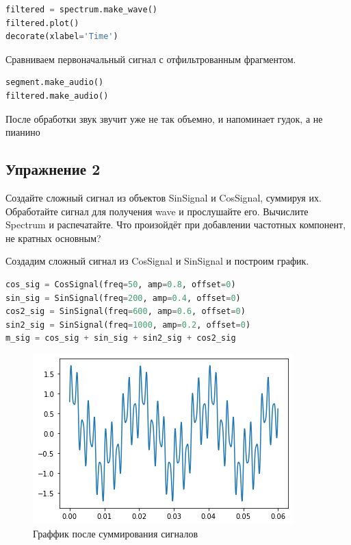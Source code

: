 \begin{lstlisting}[language=Python]
filtered = spectrum.make_wave()
filtered.plot()
decorate(xlabel='Time')
\end{lstlisting}

Сравниваем первоначальный сигнал с отфильтрованным фрагментом.

\begin{lstlisting}[language=Python]
segment.make_audio()
filtered.make_audio()
\end{lstlisting}

После обработки звук звучит уже не так объемно, и напоминает гудок, а не пианино

\subsection{Упражнение 2}

Создайте сложный сигнал из объектов SinSignal и CosSignal, суммируя их. Обработайте сигнал для получения wave и прослушайте его. Вычислите Spectrum и распечатайте. Что произойдёт при добавлении частотных компонент, не кратных основным?


Создадим сложный сигнал из CosSignal и SinSignal и построим график.
\begin{lstlisting}[language=Python]
cos_sig = CosSignal(freq=50, amp=0.8, offset=0)
sin_sig = SinSignal(freq=200, amp=0.4, offset=0)
cos2_sig = SinSignal(freq=600, amp=0.6, offset=0)
sin2_sig = SinSignal(freq=1000, amp=0.2, offset=0)
m_sig = cos_sig + sin_sig + sin2_sig + cos2_sig
\end{lstlisting}

\begin{figure}[H]
	\begin{center}
		\includegraphics[scale=1]{fig/lab01/lab01_6.png}
		\caption{Граффик после суммирования сигналов}
	\end{center}
\end{figure}

